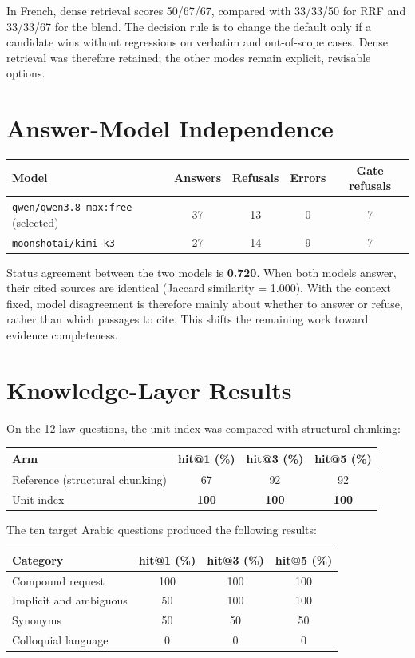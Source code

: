 \documentclass[a4paper,12pt,openany]{report}
\begin{document}
In French, dense retrieval scores 50/67/67, compared with 33/33/50 for RRF and 33/33/67 for the
blend. The decision rule is to change the default only if a candidate wins without regressions on
verbatim and out-of-scope cases. Dense retrieval was therefore retained; the other modes remain
explicit, revisable options.

\section{Answer-Model Independence}
\begin{table}[htbp]
\centering
\small
\begin{tabular}{lcccc}
\toprule
\textbf{Model} & \textbf{Answers} & \textbf{Refusals} & \textbf{Errors} &
\textbf{Gate refusals} \\
\midrule
\texttt{qwen/qwen3.8-max:free} (selected) & 37 & 13 & 0 & 7 \\
\texttt{moonshotai/kimi-k3} & 27 & 14 & 9 & 7 \\
\bottomrule
\end{tabular}
\end{table}

Status agreement between the two models is \textbf{0.720}. When both models answer, their cited
sources are identical (Jaccard similarity = 1.000). With the context fixed, model disagreement is
therefore mainly about whether to answer or refuse, rather than which passages to cite. This
shifts the remaining work toward evidence completeness.

\section{Knowledge-Layer Results}
On the 12 law questions, the unit index was compared with structural chunking:

\begin{table}[htbp]
\centering
\begin{tabular}{lccc}
\toprule
\textbf{Arm} & \textbf{hit@1 (\%)} & \textbf{hit@3 (\%)} & \textbf{hit@5 (\%)} \\
\midrule
Reference (structural chunking) & 67 & 92 & 92 \\
Unit index & \textbf{100} & \textbf{100} & \textbf{100} \\
\bottomrule
\end{tabular}
\end{table}

The ten target Arabic questions produced the following results:
\begin{table}[htbp]
\centering
\small
\begin{tabular}{lccc}
\toprule
\textbf{Category} & \textbf{hit@1 (\%)} & \textbf{hit@3 (\%)} & \textbf{hit@5 (\%)} \\
\midrule
Compound request & 100 & 100 & 100 \\
Implicit and ambiguous & 50 & 100 & 100 \\
Synonyms & 50 & 50 & 50 \\
Colloquial language & 0 & 0 & 0 \\
\bottomrule
\end{tabular}
\end{table}
\end{document}
